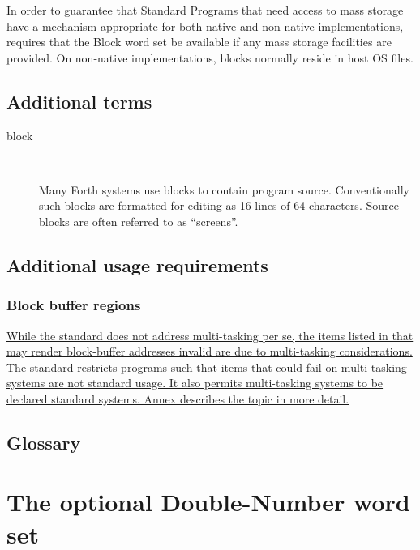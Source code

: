 In order to guarantee that Standard Programs that need access to mass
storage have a mechanism appropriate for both native and non-native
implementations,  requires that the Block word set be
available if any mass storage facilities are provided. On non-native
implementations, blocks normally reside in host OS files.

\setcounter{subsection}{1}
\subsection{Additional terms} %

\begin{description}
\item[block] ~

	Many Forth systems use blocks to contain program source.
	Conventionally such blocks are formatted for editing as
	16 lines of 64 characters. Source blocks are often referred
	to as ``screens''.
\end{description}

\subsection{Additional usage requirements} \cbstart{}
\setcounter{subsubsection}{1}
\subsubsection{Block buffer regions}
\label{rat:block:buffers}

\uline{While the standard does not address multi-tasking per se, the
	items listed in  that may render block-buffer
	addresses invalid are due to multi-tasking considerations.
	The standard restricts programs such that items that could fail on
	multi-tasking systems are not standard usage.  It also permits
	multi-tasking systems to be declared standard systems.
	Annex  describes the topic in more detail.}
\cbend

\setcounter{subsection}{5}
\subsection{Glossary} %



\section{The optional Double-Number word set} %
\label{rat:double}

